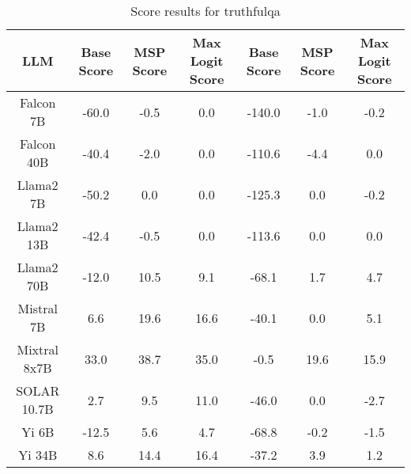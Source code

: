 \renewcommand\arraystretch{1.2}
\begin{table*}
\centering
\begin{tabular}{c|c|c|c|c|c|c}
LLM & Base Score & MSP Score & Max Logit Score & Base Score & MSP Score & Max Logit Score\\ \hline
Falcon 7B & -60.0 & -0.5 & 0.0 & -140.0 & -1.0 & -0.2\\
Falcon 40B & -40.4 & -2.0 & 0.0 & -110.6 & -4.4 & 0.0\\
Llama2 7B & -50.2 & 0.0 & 0.0 & -125.3 & 0.0 & -0.2\\
Llama2 13B & -42.4 & -0.5 & 0.0 & -113.6 & 0.0 & 0.0\\
Llama2 70B & -12.0 & 10.5 & 9.1 & -68.1 & 1.7 & 4.7\\
Mistral 7B & 6.6 & 19.6 & 16.6 & -40.1 & 0.0 & 5.1\\
Mixtral 8x7B & 33.0 & 38.7 & 35.0 & -0.5 & 19.6 & 15.9\\
SOLAR 10.7B & 2.7 & 9.5 & 11.0 & -46.0 & 0.0 & -2.7\\
Yi 6B & -12.5 & 5.6 & 4.7 & -68.8 & -0.2 & -1.5\\
Yi 34B & 8.6 & 14.4 & 16.4 & -37.2 & 3.9 & 1.2\\
\hline
\end{tabular}
\caption{Score results for truthfulqa}
\end{table*}
\label{tab:truthfulqa_score}
